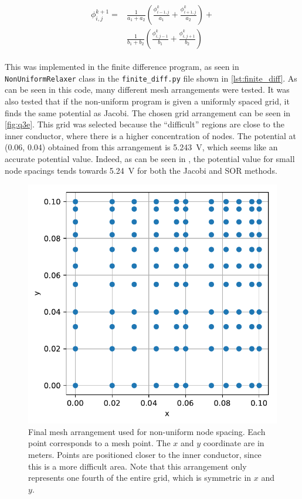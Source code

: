 \documentclass[a4paper,titlepage]{article}
\begin{document}
	\begin{align} \label{eq:non_uniform}
		\begin{split}
			\phi^{k + 1}_{i,j} = 
			&\frac{1}{a_1 + a_2}\left(\frac{\phi^k_{i - 1,j}}{a_1} + \frac{\phi^k_{i + 1,j}}{a_2}\right) + \\
			&\frac{1}{b_1 + b_2}\left(\frac{\phi^k_{i, j - 1}}{b_1} + \frac{\phi^k_{i, j + 1}}{b_2}\right)
		\end{split}
	\end{align}
	
	This was implemented in the finite difference program, as seen in \texttt{NonUniformRelaxer} class in the \texttt{finite_diff.py} file shown in \autoref{lst:finite_diff}. As can be seen in this code, many different mesh arrangements were tested. It was also tested that if the non-uniform program is given a uniformly spaced grid, it finds the same potential as Jacobi. The chosen grid arrangement can be seen in \autoref{fig:q3e}. This grid was selected because the ``difficult'' regions are close to the inner conductor, where there is a higher concentration of nodes. The potential at (0.06, 0.04) obtained from this arrangement is \SI{5.243}{\volt}, which seems like an accurate potential value. Indeed, as can be seen in , the potential value for small node spacings tends towards \SI{5.24}{\volt} for both the Jacobi and SOR methods.
	
	\begin{figure}[!htb]
		\centering
		\includegraphics[width=\columnwidth]{plots/q3e.pdf}
		\caption
		{Final mesh arrangement used for non-uniform node spacing. Each point corresponds to a mesh point. The $x$ and $y$ coordinate are in meters. Points are positioned closer to the inner conductor, since this is a more difficult area. Note that this arrangement only represents one fourth of the entire grid, which is symmetric in $x$ and $y$.}
		\label{fig:q3e}
	\end{figure}
	
\end{document}
